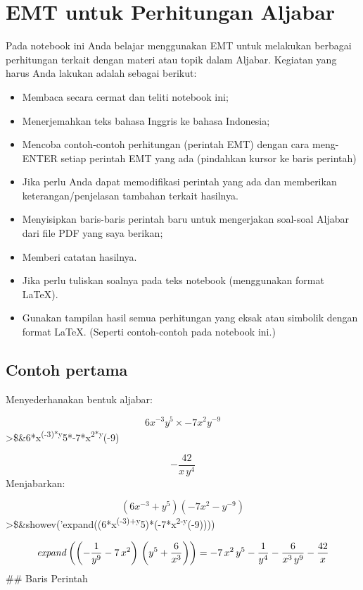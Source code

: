 \documentclass[
]{book}
\author{}
\date{}
\begin{document}
\frontmatter

\mainmatter
\chapter{EMT untuk Perhitungan Aljabar}\label{emt-untuk-perhitungan-aljabar}

Pada notebook ini Anda belajar menggunakan EMT untuk melakukan berbagai perhitungan terkait dengan materi atau topik dalam Aljabar. Kegiatan yang harus Anda lakukan adalah sebagai berikut:

\begin{itemize}
\item
  Membaca secara cermat dan teliti notebook ini;
\item
  Menerjemahkan teks bahasa Inggris ke bahasa Indonesia;
\item
  Mencoba contoh-contoh perhitungan (perintah EMT) dengan cara meng-ENTER setiap perintah EMT yang ada (pindahkan kursor ke baris perintah)
\item
  Jika perlu Anda dapat memodifikasi perintah yang ada dan memberikan keterangan/penjelasan tambahan terkait hasilnya.
\item
  Menyisipkan baris-baris perintah baru untuk mengerjakan soal-soal Aljabar dari file PDF yang saya berikan;
\item
  Memberi catatan hasilnya.
\item
  Jika perlu tuliskan soalnya pada teks notebook (menggunakan format LaTeX).
\item
  Gunakan tampilan hasil semua perhitungan yang eksak atau simbolik dengan format LaTeX. (Seperti contoh-contoh pada notebook ini.)
\end{itemize}

\section{Contoh pertama}\label{contoh-pertama}

Menyederhanakan bentuk aljabar:

\[6x^{-3}y^5\times -7x^2y^{-9}\]\textgreater\$\&6*x\textsuperscript{(-3)*y}5*-7*x\textsuperscript{2*y}(-9)

\[-\frac{42}{x\,y^4}\]Menjabarkan:

\[(6x^{-3}+y^5)(-7x^2-y^{-9})\]\textgreater\$\&showev('expand((6*x\textsuperscript{(-3)+y}5)*(-7*x\textsuperscript{2-y}(-9))))

\[{\it expand}\left(\left(-\frac{1}{y^9}-7\,x^2\right)\,\left(y^5+\frac{6}{x^3}\right)\right)=-7\,x^2\,y^5-\frac{1}{y^4}-\frac{6}{x^3 \,y^9}-\frac{42}{x}\] \#\# Baris Perintah
\end{document}
